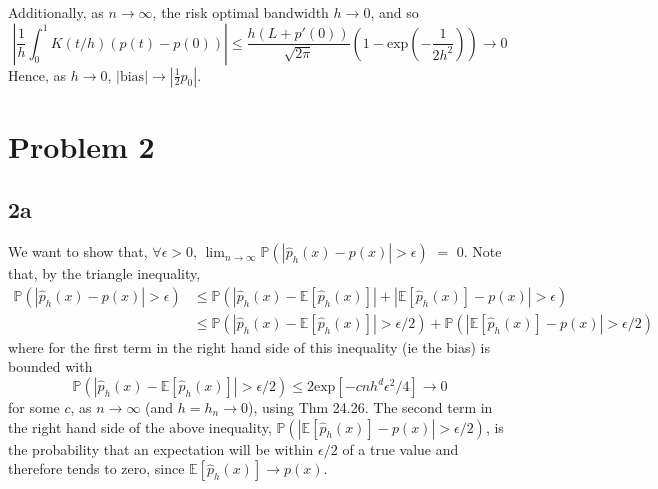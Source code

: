 \documentclass[12pt]{article}
\begin{document}
Additionally, as $n \rightarrow \infty$, the risk optimal bandwidth $h \rightarrow 0$, and so 
\begin{equation}
    \left| \frac{1}{h} \int_0^1 K(t/h)(p(t)-p(0)) \right|
    \leq \frac{h(L+p'(0))}{\sqrt{2\pi}} \left(1 - \text{exp}\left(-\frac{1}{2h^2}\right) \right) 
    \rightarrow 0
\end{equation}
Hence, as $h \rightarrow 0$, $|\text{bias}| \rightarrow |\frac{1}{2}p_0|$.


\section*{Problem 2}
\label{sec:prob2}

\subsection*{2a}
We want to show that, $\forall \epsilon > 0$,
$\lim_{n \rightarrow \infty} \mathbb{P} \left( \left| \hat{p}_h(x) - p(x) \right| 
    > \epsilon \right)$ $=$ $0$. Note that, by the triangle inequality,
\begin{equation*}
    \begin{split}
        \mathbb{P} \left( \left| \hat{p}_h(x) - p(x) \right| > \epsilon \right)
        &\leq  \mathbb{P} \left( \left| \hat{p}_h(x) - \mathbb{E}[\hat{p}_h(x)] \right| + 
                \left| \mathbb{E}[\hat{p}_h(x)] - p(x) \right| > \epsilon \right) \\
            &\leq  \mathbb{P} \left( \left| \hat{p}_h(x) - \mathbb{E}[\hat{p}_h(x)] \right| > \epsilon/2 \right)
                + \mathbb{P} \left( \left| \mathbb{E}[\hat{p}_h(x)] - p(x) \right| > \epsilon/2 \right)
    \end{split}
\end{equation*}
where for the first term in the right hand side of this inequality (ie the bias) is bounded with
\begin{equation}
    \mathbb{P} \left( \left| \hat{p}_h(x) - \mathbb{E}[\hat{p}_h(x)] \right| > \epsilon/2 \right)
        \leq 2 \text{exp} \left[-cnh^d\epsilon^2/4\right]
        \rightarrow 0
\end{equation}
for some $c$, as $n \rightarrow \infty$ (and $h = h_n \rightarrow 0$), using Thm 24.26. The second term in the right hand side
 of the above inequality, $\mathbb{P} \left( \left| \mathbb{E}[\hat{p}_h(x)] - p(x) \right| > \epsilon/2 \right)$,
 is the probability that an expectation will be within $\epsilon/2$ of a true value and therefore 
 tends to zero, since $\mathbb{E}[\hat{p}_h(x)] \rightarrow p(x)$.
\end{document}
